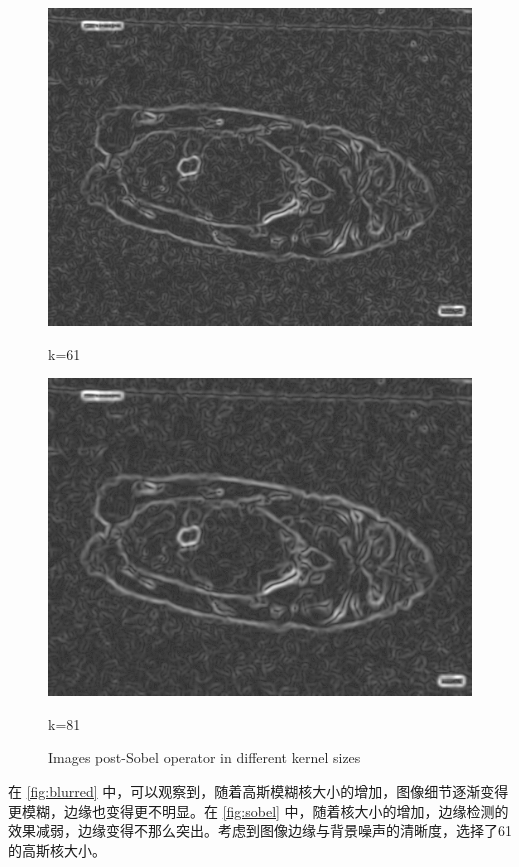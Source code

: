 \begin{figure}
\begin{minipage}{0.24\textwidth}
        \includegraphics[width=\textwidth]{./fig/gausssian/sobel61.jpg}
        \caption*{k=61}
        \label{fig:sobel61}
    \end{minipage}
    \begin{minipage}{0.24\textwidth}
        \centering
        \includegraphics[width=\textwidth]{./fig/gausssian/sobel81.jpg}
        \caption*{k=81}
        \label{fig:sobel81}
    \end{minipage}
    \caption{Images post-Sobel operator in different kernel sizes}
    \label{fig:sobel}
\end{figure}


在 \autoref{fig:blurred} 中，可以观察到，随着高斯模糊核大小的增加，图像细节逐渐变得更模糊，边缘也变得更不明显。在 \autoref{fig:sobel} 中，随着核大小的增加，边缘检测的效果减弱，边缘变得不那么突出。考虑到图像边缘与背景噪声的清晰度，选择了61的高斯核大小。

